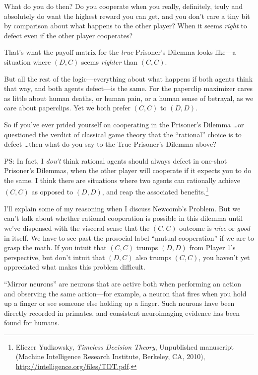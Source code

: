 {
 What do you do then? Do you cooperate when you really, definitely,
truly and absolutely do want the highest reward you can get, and you
don't care a tiny bit by comparison about what happens
to the other player? When it seems \textit{right} to defect even if the
other player cooperates?}

{
 That's what the payoff matrix for the
\textit{true} Prisoner's Dilemma looks like---a
situation where $(D,C)$ seems \textit{righter} than $(C,C)$.}

{
 But all the rest of the logic---everything about what happens if
both agents think that way, and both agents defect---is the same. For
the paperclip maximizer cares as little about human deaths, or human
pain, or a human sense of betrayal, as we care about paperclips. Yet we
both prefer $(C,C)$ to $(D,D)$.}

{
 So if you've ever prided yourself on cooperating
in the Prisoner's Dilemma \ldots or questioned the
verdict of classical game theory that the
``rational'' choice is to defect
\ldots then what do you say to the True Prisoner's
Dilemma above?}

{
 PS: In fact, I \textit{don't} think rational
agents should always defect in one-shot Prisoner's
Dilemmas, when the other player will cooperate if it expects you to do
the same. I think there are situations where two agents can rationally
achieve $(C,C)$ as opposed to $(D,D)$, and reap the associated
benefits.\footnote{Eliezer Yudkowsky, \textit{Timeless Decision Theory},
Unpublished manuscript (Machine Intelligence Research Institute,
Berkeley, CA, 2010), \url{http://intelligence.org/files/TDT.pdf}.}}

{
 I'll explain some of my reasoning when I discuss
Newcomb's Problem. But we can't talk
about whether rational cooperation is possible in this dilemma until
we've dispensed with the visceral sense that the $(C,C)$
outcome is \textit{nice} or \textit{good} in itself. We have to see
past the prosocial label ``mutual
cooperation'' if we are to grasp the math. If you
intuit that $(C,C)$ trumps $(D,D)$ from Player 1's
perspective, but don't intuit that $(D,C)$ also trumps
$(C,C)$, you haven't yet appreciated what makes this
problem difficult.}

\myendsectiontext


{
 ``Mirror neurons'' are neurons
that are active both when performing an action and observing the same
action---for example, a neuron that fires when you hold up a finger or
see someone else holding up a finger. Such neurons have been directly
recorded in primates, and consistent neuroimaging evidence has been
found for humans. }

